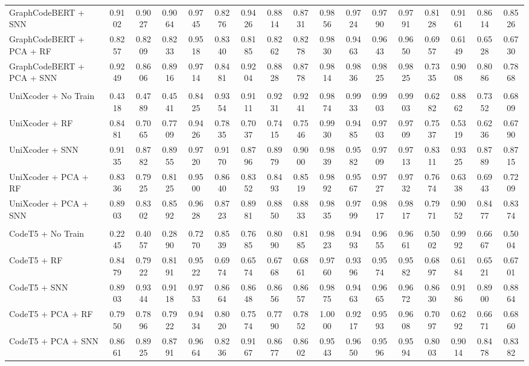 \documentclass[authoryear,final,5p,times,twocolumn]{elsarticle}
\theoremstyle{plain}
\begin{document}
\begin{table}[t]
{\begin{tabular}{l*{16}{c}}
GraphCodeBERT + SNN & 0.9102 & 0.9027 & 0.9064 & 0.9745 & 0.8276 & 0.9426 & 0.8814 & 0.8731 & 0.9856 & 0.9724 & 0.9790 & 0.9791 & 0.8128 & 0.9161 & 0.8614 & 0.8526 \\
GraphCodeBERT + PCA + RF & 0.8257 & 0.8209 & 0.8233 & 0.9518 & 0.8340 & 0.8185 & 0.8262 & 0.8278 & 0.9830 & 0.9463 & 0.9643 & 0.9650 & 0.6957 & 0.6149 & 0.6528 & 0.6730 \\
GraphCodeBERT + PCA + SNN & 0.9249 & 0.8606 & 0.8916 & 0.9714 & 0.8481 & 0.9204 & 0.8828 & 0.8778 & 0.9814 & 0.9836 & 0.9825 & 0.9825 & 0.7335 & 0.9008 & 0.8086 & 0.7868 \\
\addlinespace[2pt]
\multicolumn{17}{l}{\textit{UniXcoder}} \\
UniXcoder + No Train & 0.4318 & 0.4789 & 0.4541 & 0.8425 & 0.9354 & 0.9111 & 0.9231 & 0.9241 & 0.9874 & 0.9933 & 0.9903 & 0.9903 & 0.6282 & 0.8862 & 0.7352 & 0.6809 \\
UniXcoder + RF & 0.8481 & 0.7065 & 0.7709 & 0.9426 & 0.7835 & 0.7037 & 0.7415 & 0.7546 & 0.9930 & 0.9485 & 0.9703 & 0.9709 & 0.7537 & 0.5319 & 0.6236 & 0.6790 \\
UniXcoder + SNN & 0.9135 & 0.8782 & 0.8955 & 0.9720 & 0.9170 & 0.8796 & 0.8979 & 0.9000 & 0.9839 & 0.9582 & 0.9709 & 0.9713 & 0.8311 & 0.9325 & 0.8789 & 0.8715 \\
UniXcoder + PCA + RF & 0.8336 & 0.7925 & 0.8125 & 0.9500 & 0.8640 & 0.8352 & 0.8493 & 0.8519 & 0.9892 & 0.9567 & 0.9727 & 0.9732 & 0.7674 & 0.6338 & 0.6943 & 0.7209 \\
UniXcoder + PCA + SNN & 0.8903 & 0.8302 & 0.8592 & 0.9628 & 0.8723 & 0.8981 & 0.8850 & 0.8833 & 0.9835 & 0.9799 & 0.9817 & 0.9817 & 0.7971 & 0.9052 & 0.8477 & 0.8374 \\
\addlinespace[2pt]
\multicolumn{17}{l}{\textit{CodeT5}} \\
CodeT5 + No Train & 0.2245 & 0.4057 & 0.2890 & 0.7270 & 0.8539 & 0.7685 & 0.8090 & 0.8185 & 0.9823 & 0.9493 & 0.9655 & 0.9661 & 0.5002 & 0.9992 & 0.6667 & 0.5004 \\
CodeT5 + RF & 0.8479 & 0.7922 & 0.8191 & 0.9522 & 0.6974 & 0.6574 & 0.6768 & 0.6861 & 0.9760 & 0.9396 & 0.9574 & 0.9582 & 0.6897 & 0.6184 & 0.6521 & 0.6701 \\
CodeT5 + SNN & 0.8903 & 0.9344 & 0.9118 & 0.9753 & 0.8664 & 0.8648 & 0.8656 & 0.8657 & 0.9875 & 0.9463 & 0.9665 & 0.9672 & 0.8630 & 0.9186 & 0.8900 & 0.8864 \\
CodeT5 + PCA + RF & 0.7950 & 0.7896 & 0.7922 & 0.9434 & 0.8020 & 0.7574 & 0.7790 & 0.7852 & 1.0000 & 0.9217 & 0.9593 & 0.9608 & 0.7097 & 0.6292 & 0.6671 & 0.6860 \\
CodeT5 + PCA + SNN & 0.8661 & 0.8925 & 0.8791 & 0.9664 & 0.8236 & 0.9167 & 0.8677 & 0.8602 & 0.9543 & 0.9650 & 0.9596 & 0.9594 & 0.8003 & 0.9014 & 0.8478 & 0.8382 \\
\bottomrule
\end{tabular}%
}
\end{table}
\end{document}
